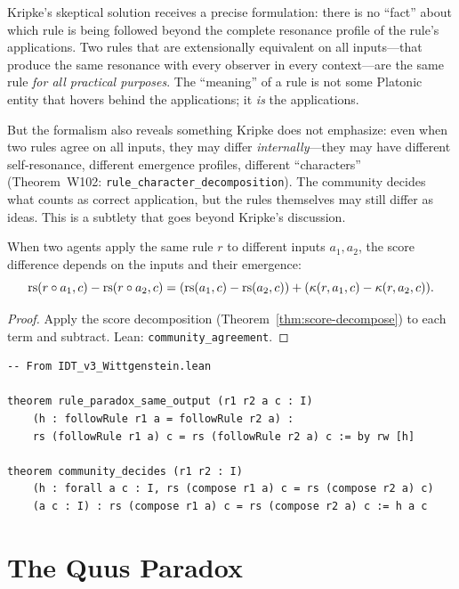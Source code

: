 \begin{interpretation}
\label{interp:kripke}
Kripke's skeptical solution receives a precise formulation: there is no
``fact'' about which rule is being followed beyond the complete resonance
profile of the rule's applications. Two rules that are extensionally
equivalent on all inputs---that produce the same resonance with every
observer in every context---are the same rule \emph{for all practical
purposes}. The ``meaning'' of a rule is not some Platonic entity that
hovers behind the applications; it \emph{is} the applications.

But the formalism also reveals something Kripke does not emphasize: even
when two rules agree on all inputs, they may differ \emph{internally}---they
may have different self-resonance, different emergence profiles, different
``characters'' (Theorem~W102: \texttt{rule\_character\_decomposition}).
The community decides what counts as correct application, but the rules
themselves may still differ as ideas. This is a subtlety that goes beyond
Kripke's discussion.
\end{interpretation}

\begin{theorem}
\label{thm:community-agreement}
When two agents apply the same rule $r$ to different inputs $a_1, a_2$,
the score difference depends on the inputs and their emergence:
\[
\mathrm{rs}(r \circ a_1, c) - \mathrm{rs}(r \circ a_2, c) =
(\mathrm{rs}(a_1, c) - \mathrm{rs}(a_2, c)) + (\kappa(r, a_1, c) - \kappa(r, a_2, c)).
\]
\end{theorem}

\begin{proof}
Apply the score decomposition (Theorem~\ref{thm:score-decompose}) to each
term and subtract. Lean: \texttt{community\_agreement}.
\end{proof}

\begin{lstlisting}
-- From IDT_v3_Wittgenstein.lean

theorem rule_paradox_same_output (r1 r2 a c : I)
    (h : followRule r1 a = followRule r2 a) :
    rs (followRule r1 a) c = rs (followRule r2 a) c := by rw [h]

theorem community_decides (r1 r2 : I)
    (h : forall a c : I, rs (compose r1 a) c = rs (compose r2 a) c)
    (a c : I) : rs (compose r1 a) c = rs (compose r2 a) c := h a c
\end{lstlisting}

\section{The Quus Paradox}

